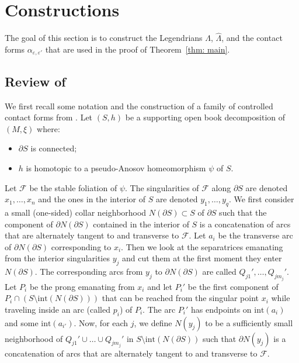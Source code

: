 \documentclass[JEP,XML,SOM,Unicode,NoFloatCountersInSection]{cedram}
\let\mathcal\mathscr
\newcommand{\inte}{\mathrm{int}}
\theoremstyle{plain}
\theoremstyle{definition}
\numberwithin{equation}{subsection}
\newcommand{\cF}{\mathcal{F}}
\newcommand{\bdry}{\partial}
\begin{document}
\section{Constructions}\label{section: constructions}

The goal of this section is to construct the Legendrians $\Lambda$, $\widehat{\Lambda}$, and the contact forms $\alpha_{\varepsilon, \varepsilon'}$ that are used in the proof of Theorem~\ref{thm: main}.

\subsection{Review of \cite{CH2}}

We first recall some notation and the construction of a family of controlled contact forms from \cite{CH2}.
Let $(S,h)$ be a supporting open book decomposition of $(M,\xi)$ where:
\begin{itemize}
\item $\partial S$ is connected;
\item $h$ is homotopic to a pseudo-Anosov homeomorphism $\psi$ of $S$.
\end{itemize}

Let $\cF$ be the stable foliation of $\psi$. The singularities of $\cF$ along $\partial S$ are denoted $x_1,\dots ,x_n$ and the ones in the interior of $S$ are denoted $y_1,\dots ,y_q$. We first consider a small (one-sided) collar neighborhood $N(\bdry S)\subset S$ of $\partial S$ such that the component of $\partial N(\bdry S)$ contained in the interior of $S$ is a concatenation of arcs that are alternately tangent to and transverse to $\cF$. Let $a_i$ be the transverse arc of $\bdry N(\bdry S)$ corresponding to $x_i$. Then we look at the separatrices emanating from the interior singularities $y_j$ and cut them at the first moment they enter $N(\bdry S)$. The corresponding arcs from $y_j$ to $\partial N(\bdry S)$ are called $Q_{j1}', \dots, Q_{jm_j}'$. Let $P_i$ be the prong emanating from $x_i$ and let $P_i'$ be the first component of $P_i\cap (S\setminus\inte(N(\bdry S)))$ that can be reached from the singular point $x_i$ while traveling inside an arc (called $p_i$) of $P_i$. The arc $P_i'$ has endpoints on $\inte(a_i)$ and some $\inte(a_{i'})$. Now, for each $j$, we define $N(y_j)$ to be a sufficiently small neighborhood of $Q_{j1}'\cup \dots\cup Q_{jm_j}'$ in $S\setminus\inte(N(\bdry S))$ such that $\bdry N(y_j)$ is a concatenation of arcs that are alternately tangent to and transverse to $\cF$.
\end{document}
